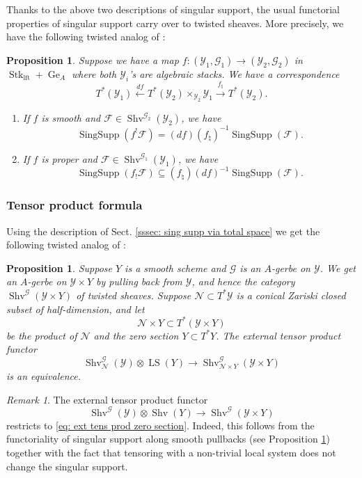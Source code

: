 \documentclass[10pt]{amsart}
\newcommand{\sssec}{\subsubsection}
\newtheorem{prop}[subsubsection]{Proposition}
\theoremstyle{remark}
\newtheorem{rmk}[subsubsection]{Remark}
\newcommand{\nat}{\natural}
\newcommand{\on}{\operatorname}
\newcommand{\cF}{\mathcal{F}}
\newcommand{\cG}{\mathcal{G}}
\newcommand{\cN}{\mathcal{N}}
\newcommand{\cY}{\mathcal{Y}}
\newcommand{\Shv}{\on{Shv}}
\newcommand{\LS}{\on{LS}}
\newcommand{\Stklft}{\on{Stk}_{\on{lft}}}
\begin{document}
\sssec{}
Thanks to the above two descriptions of singular support, the usual functorial properties of singular support carry over to twisted sheaves. More precisely, we have the following twisted analog of \cite[Sect. 5.4]{KS}:
\begin{prop}\label{prop: SingSupp functoriality}
    Suppose we have a map $f:(\cY_1,\cG_1)\rightarrow (\cY_2,\cG_2)$ in $\Stklft+\on{Ge}_A$ where both $\cY_i$'s are algebraic stacks. We have a correspondence
    \[T^*(\cY_1)\xleftarrow{df} T^*(\cY_2)\times_{\cY_2} \cY_1 \xrightarrow{f_{\nat}}T^*(\cY_2).\]
    \begin{enumerate}
        \item If $f$ is smooth and $\cF\in\Shv^{\cG_2}(\cY_2)$, we have 
        \[\on{SingSupp}(f^!\cF)=(df) (f_{\nat})^{-1} \on{SingSupp}(\cF).\]
        \item If $f$ is proper and $\cF\in\Shv^{\cG_1}(\cY_1)$, we have
        \[\on{SingSupp}(f_!\cF)\subseteq (f_{\nat})(df)^{-1}\on{SingSupp}(\cF).\]
    \end{enumerate}
\end{prop}

\sssec{Tensor product formula}
Using the description of Sect. \ref{sssec: sing supp via total space} we get the following twisted analog of \cite[Theorem A.3.9]{GKRV}: 

\begin{prop}
    Suppose $Y$ is a smooth scheme and $\cG$ is an $A$-gerbe on $\cY$. We get an $A$-gerbe on $\cY\times Y$ by pulling back from $\cY$, and hence the category $\Shv^{\cG}(\cY\times Y)$ of twisted sheaves. Suppose $\cN\subset T^*\cY$ is a conical Zariski closed subset of half-dimension, and let
    \[\cN\times Y\subset T^*(\cY\times Y)\]
    be the product of $\cN$ and the zero section $Y\subset T^*Y$.
    The external tensor product functor
    \begin{equation}\label{eq: ext tens prod zero section}
        \Shv^{\cG}_{\cN}(\cY)\otimes \LS(Y)\rightarrow \Shv^{\cG}_{\cN\times Y}(\cY\times Y)
    \end{equation}
    is an equivalence.
\end{prop}

\begin{rmk}
    The external tensor product functor
    \[\Shv^{\cG}(\cY)\otimes \Shv(Y)\rightarrow \Shv^{\cG}(\cY\times Y)\]
    restricts to \eqref{eq: ext tens prod zero section}. Indeed, this follows from the functoriality of singular support along smooth pullbacks (see Proposition \ref{prop: SingSupp functoriality}) together with the fact that tensoring with a non-trivial local system does not change the singular support.
\end{rmk}
\end{document}
